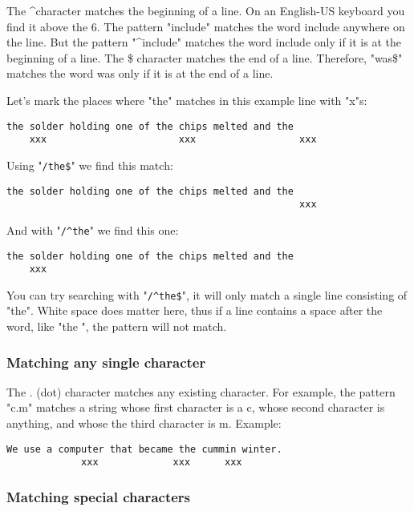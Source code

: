 The \textasciicircum character matches the beginning of a line.
On an English-US keyboard you find it above the 6.
The pattern "include" matches the word include anywhere on the line.
But the pattern "\textasciicircum include" matches the word include only if it is at the beginning of a line.
The \$ character matches the end of a line.
Therefore, "was\$" matches the word was only if it is at the end of a line.

Let's mark the places where "the" matches in this example line with "x"s:

		\begin{Verbatim}[samepage=true]
    the solder holding one of the chips melted and the 
    xxx                       xxx                  xxx
		\end{Verbatim}

Using "\verb!/the$!" we find this match:

		\begin{Verbatim}[samepage=true]
    the solder holding one of the chips melted and the 
                                                   xxx
		\end{Verbatim}

And with "\verb!/^the!" we find this one:

		\begin{Verbatim}[samepage=true]
    the solder holding one of the chips melted and the 
    xxx
		\end{Verbatim}

You can try searching with "\verb!/^the$!", it will only match a single line consisting of "the".
White space does matter here, thus if a line contains a space after the word, like "the ", the pattern will not match.

\subsubsection{Matching any single character}

The . (dot) character matches any existing character.
For example, the pattern "c.m" matches a string whose first character is a c, whose second character is anything, and whose the third character is m.
Example:

		\begin{Verbatim}[samepage=true]
    We use a computer that became the cummin winter. 
             xxx             xxx      xxx
		\end{Verbatim}


\subsubsection{Matching special characters}

